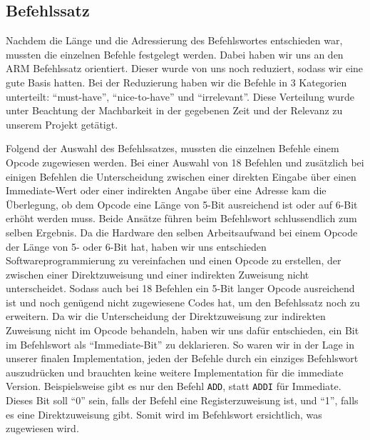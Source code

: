 \documentclass[paper=a4,fontsize=12pt,twocolumn]{scrreprt}
\begin{document}
\subsection{Befehlssatz}

Nachdem die Länge und die Adressierung des Befehlswortes entschieden war, mussten die einzelnen Befehle festgelegt werden.
Dabei haben wir uns an den ARM Befehlssatz orientiert\footnotemark.
Dieser wurde von uns noch reduziert, sodass wir eine gute Basis hatten.
Bei der Reduzierung haben wir die Befehle in 3 Kategorien unterteilt: \enquote{must-have}, \enquote{nice-to-have} und \enquote{irrelevant}.
Diese Verteilung wurde unter Beachtung der Machbarkeit in der gegebenen Zeit und der Relevanz zu unserem Projekt getätigt.


Folgend der Auswahl des Befehlssatzes, mussten die einzelnen Befehle einem Opcode zugewiesen werden.
Bei einer Auswahl von 18 Befehlen und zusätzlich bei einigen Befehlen die Unterscheidung zwischen einer direkten Eingabe über einen Immediate-Wert oder einer indirekten Angabe über eine Adresse kam die Überlegung, ob dem Opcode eine Länge von 5-Bit ausreichend ist oder auf 6-Bit erhöht werden muss.
Beide Ansätze führen beim Befehlswort schlussendlich zum selben Ergebnis.
Da die Hardware den selben Arbeitsaufwand bei einem Opcode der Länge von 5- oder 6-Bit hat, haben wir uns entschieden Softwareprogrammierung zu vereinfachen und einen Opcode zu erstellen, der zwischen einer Direktzuweisung und einer indirekten Zuweisung nicht unterscheidet.
Sodass auch bei 18 Befehlen ein 5-Bit langer Opcode ausreichend ist und noch genügend nicht zugewiesene Codes hat, um den Befehlssatz noch zu erweitern.
Da wir die Unterscheidung der Direktzuweisung zur indirekten Zuweisung nicht im Opcode behandeln, haben wir uns dafür entschieden, ein Bit im Befehlswort als \enquote{Immediate-Bit} zu deklarieren.
So waren wir in der Lage in unserer finalen Implementation, jeden der Befehle durch ein einziges Befehlswort auszudrücken und brauchten keine weitere Implementation für die immediate Version.
Beispielsweise gibt es nur den Befehl \texttt{ADD}, statt \texttt{ADDI} für Immediate.
Dieses Bit soll \enquote{0} sein, falls der Befehl eine Registerzuweisung ist, und \enquote{1}, falls es eine Direktzuweisung gibt.
Somit wird im Befehlswort ersichtlich, was zugewiesen wird.
\end{document}
